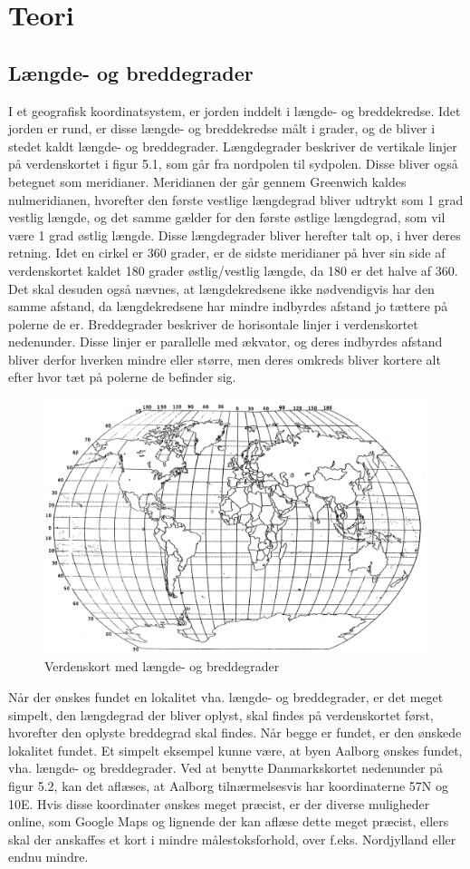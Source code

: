 \chapter{Teori} %
\section{Længde- og breddegrader}
I et geografisk koordinatsystem, er jorden inddelt i længde- og breddekredse. Idet jorden er rund, er disse længde- og breddekredse målt i grader, og de bliver i stedet kaldt længde- og breddegrader. \newline
Længdegrader beskriver de vertikale linjer på verdenskortet i figur 5.1, som går fra nordpolen til sydpolen. Disse bliver også betegnet som meridianer. Meridianen der går gennem Greenwich kaldes nulmeridianen, hvorefter den første vestlige længdegrad bliver udtrykt som 1 grad vestlig længde, og det samme gælder for den første østlige længdegrad, som vil være 1 grad østlig længde. Disse længdegrader bliver herefter talt op, i hver deres retning. Idet en cirkel er 360 grader, er de sidste meridianer på hver sin side af verdenskortet kaldet 180 grader østlig/vestlig længde, da 180 er det halve af 360. Det skal desuden også nævnes, at længdekredsene ikke nødvendigvis har den samme afstand, da længdekredsene har mindre indbyrdes afstand jo tættere på polerne de er. \newline
Breddegrader beskriver de horisontale linjer i verdenskortet nedenunder. Disse linjer er parallelle med ækvator, og deres indbyrdes afstand bliver derfor hverken mindre eller større, men deres omkreds bliver kortere alt efter hvor tæt på polerne de befinder sig.
\begin{figure} [h]
	\centering
	\includegraphics[width=.5\textwidth]{billeder/longlatmap}
	\caption{Verdenskort med længde- og breddegrader}
\end{figure}
Når der ønskes fundet en lokalitet vha. længde- og breddegrader, er det meget simpelt, den længdegrad der bliver oplyst, skal findes på verdenskortet først, hvorefter den oplyste breddegrad skal findes. Når begge er fundet, er den ønskede lokalitet fundet. Et simpelt eksempel kunne være, at byen Aalborg ønskes fundet, vha. længde- og breddegrader. Ved at benytte Danmarkskortet nedenunder på figur 5.2, kan det aflæses, at Aalborg tilnærmelsesvis har koordinaterne 57\textdegree N og 10\textdegree E. Hvis disse koordinater ønskes meget præcist, er der diverse muligheder online, som Google Maps og lignende der kan aflæse dette meget præcist, ellers skal der anskaffes et kort i mindre målestoksforhold, over f.eks. Nordjylland eller endnu mindre.  \citep{LongLat}
